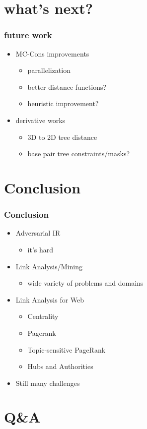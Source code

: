 \documentclass{beamer}
\begin{document}
\section{what's next?}
\begin{frame}
	\frametitle{future work}
	\begin{itemize}
		\item MC-Cons improvements
		\begin{itemize}
			\item parallelization
			\item better distance functions?
			\item heuristic improvement?
		\end{itemize}
		
		\item derivative works
		\begin{itemize}
			\item 3D to 2D tree distance
			\item base pair tree constraints/masks?
		\end{itemize}				

	\end{itemize}
\end{frame}



\section{Conclusion}

\begin{frame}
	\frametitle{Conclusion}
	\begin{itemize}
		\item Adversarial IR
		\begin{itemize}
			\item it's hard
		\end{itemize}
		\item Link Analysis/Mining
		\begin{itemize}
			\item wide variety of problems and domains
		\end{itemize}
		\item Link Analysis for Web
		\begin{itemize}
			\item Centrality
			\item Pagerank
			\item Topic-sensitive PageRank
			\item Hubs and Authorities
		\end{itemize}
		\item Still many challenges
	\end{itemize}
\end{frame}

\section{Q\&A}
\end{document}
